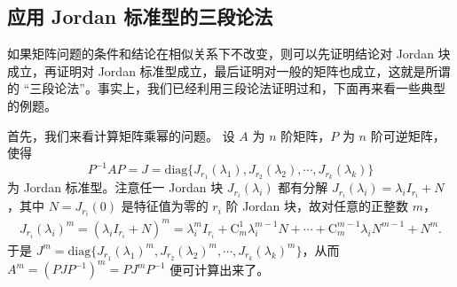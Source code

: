 \documentclass[../../main.tex]{subfiles}
\begin{document}
\subsection{应用 Jordan 标准型的三段论法}
 
如果矩阵问题的条件和结论在相似关系下不改变，则可以先证明结论对 Jordan 块成立，再证明对 Jordan 标准型成立，最后证明对一般的矩阵也成立，这就是所谓的 “三段论法”。事实上，我们已经利用三段论法证明过和，下面再来看一些典型的例题。

首先，我们来看计算矩阵乘幂的问题。
设 $A$ 为 $n$ 阶矩阵，$P$ 为 $n$ 阶可逆矩阵，使得 
\[
P^{-1}AP = J = \mathrm{diag}\{J_{r_1}(\lambda_1), J_{r_2}(\lambda_2), \cdots, J_{r_k}(\lambda_k)\}
\] 
为 Jordan 标准型。注意任一 Jordan 块 $J_{r_i}(\lambda_i)$ 都有分解 $J_{r_i}(\lambda_i) = \lambda_i I_{r_i} + N$，其中 $N = J_{r_i}(0)$ 是特征值为零的 $r_i$ 阶 Jordan 块，故对任意的正整数 $m$，
\begin{align*}
J_{r_i}(\lambda_i)^m = (\lambda_i I_{r_i} + N)^m = \lambda_i^m I_{r_i} + \mathrm{C}_m^1 \lambda_i^{m - 1} N + \cdots + \mathrm{C}_m^{m - 1} \lambda_i N^{m - 1} + N^m.
\end{align*}
于是 $J^m = \mathrm{diag}\{J_{r_1}(\lambda_1)^m, J_{r_2}(\lambda_2)^m, \cdots, J_{r_k}(\lambda_k)^m\}$，从而 $A^m = (PJP^{-1})^m = PJ^mP^{-1}$ 便可计算出来了。 
\end{document}
